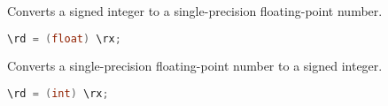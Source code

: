 %

Converts a signed integer to a single-precision floating-point number.

\begin{lstlisting}[numbers=none, basicstyle=\ttfamily\footnotesize, language=C++]
\rd = (float) \rx;
\end{lstlisting}

Converts a single-precision floating-point number to a signed integer.

\begin{lstlisting}[numbers=none, basicstyle=\ttfamily\footnotesize, language=C++]
\rd = (int) \rx;
\end{lstlisting}

